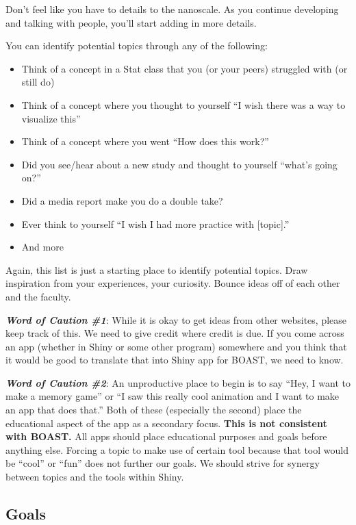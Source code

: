 \documentclass[
]{book}
\providecommand{\tightlist}{%
  \setlength{\itemsep}{0pt}\setlength{\parskip}{0pt}}
\begin{document}
Don't feel like you have to details to the nanoscale. As you continue developing and talking with people, you'll start adding in more details.

You can identify potential topics through any of the following:

\begin{itemize}
\tightlist
\item
  Think of a concept in a Stat class that you (or your peers) struggled with (or still do)
\item
  Think of a concept where you thought to yourself ``I wish there was a way to visualize this''
\item
  Think of a concept where you went ``How does this work?''
\item
  Did you see/hear about a new study and thought to yourself ``what's going on?''
\item
  Did a media report make you do a double take?
\item
  Ever think to yourself ``I wish I had more practice with {[}topic{]}.''
\item
  And more
\end{itemize}

Again, this list is just a starting place to identify potential topics. Draw inspiration from your experiences, your curiosity. Bounce ideas off of each other and the faculty.

\emph{\textbf{Word of Caution \#1}}: While it is okay to get ideas from other websites, please keep track of this. We need to give credit where credit is due. If you come across an app (whether in Shiny or some other program) somewhere and you think that it would be good to translate that into Shiny app for BOAST, we need to know.

\emph{\textbf{Word of Caution \#2}}: An unproductive place to begin is to say ``Hey, I want to make a memory game'' or ``I saw this really cool animation and I want to make an app that does that.'' Both of these (especially the second) place the educational aspect of the app as a secondary focus. \textbf{This is not consistent with BOAST.} All apps should place educational purposes and goals before anything else. Forcing a topic to make use of certain tool because that tool would be ``cool'' or ``fun'' does not further our goals. We should strive for synergy between topics and the tools within Shiny.

\hypertarget{step2c}{%
\subsection{Goals}\label{step2c}}
\end{document}
